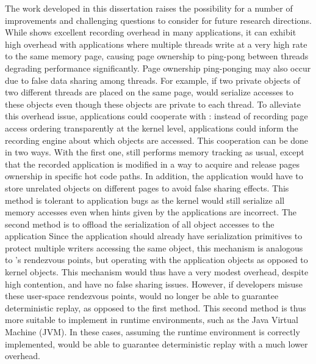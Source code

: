 The work developed in this dissertation raises the possibility for a number of
improvements and challenging questions to consider for future research
directions.
While \scribe shows excellent recording overhead in many applications, it can
exhibit high overhead with applications where multiple threads write at a
very high rate to the same memory page, causing page ownership to ping-pong
between threads degrading performance significantly.
Page ownership ping-ponging may also occur due to false data sharing among
threads. For example, if two private objects of two different threads are placed
on the same page, \scribe would serialize accesses to these objects even though
these objects are private to each thread.
To alleviate this overhead issue, applications could cooperate with \scribe: instead
of recording page access ordering transparently at the kernel level,
applications could inform the recording engine about which objects are accessed.
This cooperation can be done in two ways. With the first one,
\scribe still performs memory tracking as usual, except that the recorded
application is modified in a way to acquire and release pages ownership in
specific hot code paths. In addition, the application would have to store
unrelated objects on different pages to avoid false sharing effects.
This method is tolerant to application bugs as the kernel would still serialize
all memory accesses even when hints given by the applications are incorrect.
The second method is to offload the serialization of all object accesses to the application
Since the application should already have serialization primitives to protect
multiple writers accessing the same object, this mechanism is analogous to
\scribe's rendezvous points, but operating with the application objects as
opposed to kernel objects. This mechanism would thus have a very modest overhead,
despite high contention, and have no false sharing issues.
However, if developers misuse these user-space
rendezvous points, \scribe would no longer be able to guarantee deterministic
replay, as opposed to the first method. This second method is thus more suitable
to implement in runtime environments, such as the Java Virtual Machine (JVM).  In
these cases, assuming the runtime environment is correctly implemented, \scribe
would be able to guarantee deterministic replay with a much lower overhead.

